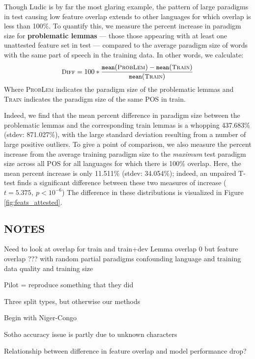 \documentclass[11pt]{article}
\begin{document}
Though Ludic is by far the most glaring example, the pattern of large paradigms in test causing low feature overlap  extends to other  languages for which overlap is less than 100\%. 
To quantify this, we measure the percent increase in paradigm size for  \textbf{problematic lemmas} --- those  those appearing with at least one unattested feature set in test --- compared to the average paradigm size of words with the same part of speech in the training data.
In other words, we calculate:
\begin{equation}
\begin{small}
\textsc{Diff} = 100* \frac{\texttt{mean}(\textsc{ProbLem}) - \texttt{mean}(\textsc{Train})}{\texttt{mean}(\textsc{Train})}
\end{small}
\end{equation} 
Where \textsc{ProbLem} indicates the paradigm size of the problematic lemmas and \textsc{Train} indicates the paradigm size of the same POS in train. 

Indeed, we find that the mean percent difference in paradigm size between the problematic lemmas and the corresponding train lemmas is a whopping 437.683\% (stdev: 871.027\%), with the large standard deviation resulting from a number of large positive outliers. 
To give a point of comparison, we also measure the percent increase from the average training paradigm size to the \textit{maximum} test paradigm size across all POS for all languages for which there is 100\% overlap. 
Here, the mean percent increase is only 11.511\% (stdev: 34.054\%); indeed, an unpaired T-test finds a significant difference between these two measures of increase ($t = 5.375,~p < 10^{-6}$)
The difference in these distributions is visualized in Figure \ref{fig:feats_attested}.


\subsection{NOTES}
Need to look at overlap for train and train+dev 
Lemma overlap 0 but feature overlap ??? with random partial paradigms 
confounding language and training data quality and training size 

Pilot = reproduce something that they did 

Three split types, but otherwise our methods 

Begin with Niger-Congo 

Sotho accuracy issue is partly due to unknown characters

Relationship between difference in feature overlap and model performance drop?
\end{document}
